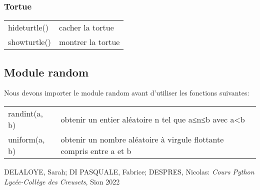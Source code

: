 \documentclass[a4paper,11pt]{article}
\begin{document}
\subsubsection{Tortue}
\begin{tabular}{l l}
hideturtle() & cacher la tortue\\
showturtle() & montrer la tortue\\
\end{tabular}

\subsection{Module random}
Nous devons importer le module random avant d'utiliser les fonctions suivantes:\par
\begin{tabular}{l l}
randint(a, b) & obtenir un entier aléatoire n tel que a≤n≤b avec a<b\\
uniform(a, b) & obtenir un nombre aléatoire à virgule flottante compris entre a et b\\
\end{tabular}


\vfill
\renewcommand{\refname}{Références}
\begin{thebibliography}{9}
 DELALOYE, Sarah; DI PASQUALE, Fabrice; DESPRES, Nicolas: \emph{Cours Python Lycée-Collège des Creusets}, Sion 2022
\end{thebibliography}
\end{document}
